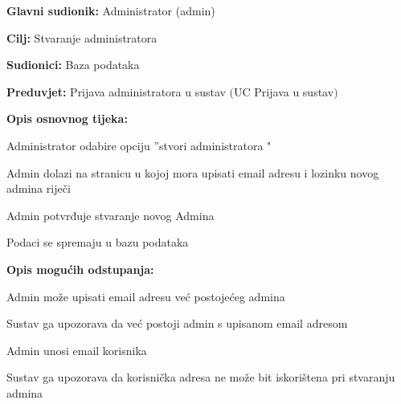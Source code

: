 \noindent {}
\begin{packed_item}

	\item \textbf{Glavni sudionik:} Administrator (admin)
	\item  \textbf{Cilj:} Stvaranje administratora
	\item  \textbf{Sudionici:} Baza podataka
	\item  \textbf{Preduvjet:} Prijava administratora u sustav $($UC Prijava u sustav$)$
	\item  \textbf{Opis osnovnog tijeka:}
	
	\item[] \begin{packed_enum}

		\item Administrator odabire opciju ”stvori administratora "
		\item Admin dolazi na stranicu u kojoj mora upisati email adresu i lozinku novog admina riječi
		\item Admin potvrđuje stvaranje novog Admina
		\item Podaci se spremaju u bazu podataka
	\end{packed_enum}
	
	\item  \textbf{Opis mogućih odstupanja:}
	
	\item[] \begin{packed_item}

		\item[2.a] Admin može upisati email adresu već postojećeg admina
		\item[] \begin{packed_enum}
			
			\item Sustav ga upozorava da već postoji admin s upisanom email adresom							
		\end{packed_enum}

		\item[2.b] Admin unosi email korisnika
		\item[] \begin{packed_enum}
			
			\item Sustav ga upozorava da korisnička adresa ne može bit iskorištena pri stvaranju admina								
		\end{packed_enum}
		
	\end{packed_item}
\end{packed_item}

